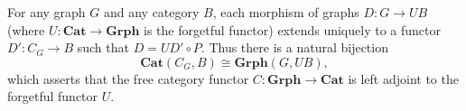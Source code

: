 For any graph $G$ and any category $B$, each morphism of graphs $D: G \to UB$ (where $U: \mathbf{Cat} \to \mathbf{Grph}$ is the forgetful functor) extends uniquely to a functor $D': C_G \to B$ such that $D = UD' \circ P$. Thus there is a natural bijection
$$\mathbf{Cat}(C_G, B) \cong \mathbf{Grph}(G, UB),$$
which asserts that the free category functor $C: \mathbf{Grph} \to \mathbf{Cat}$ is left adjoint to the forgetful functor $U$.

